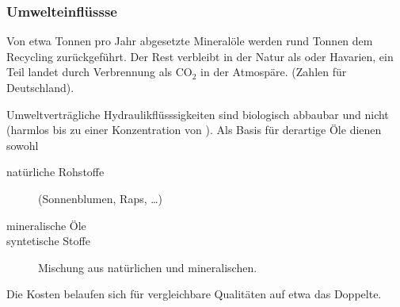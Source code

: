 \begin{frame}
  \frametitle{Umwelteinfl\"ussse}
  Von etwa  Tonnen pro Jahr abgesetzte Mineral\"ole werden
  rund  Tonnen dem Recycling zur\"uckgef\"uhrt. Der Rest 
  verbleibt in der Natur als  oder Havarien, ein 
  Teil landet durch Verbrennung als CO$_2$ in der Atmosp\"are.
  (Zahlen f\"ur Deutschland).

  Umweltvertr\"agliche Hydraulikfl\"usssigkeiten sind biologisch 
   abbaubar und nicht 
  (harmlos bis zu einer Konzentration von ).
  Als Basis f\"ur derartige \"Ole dienen sowohl 
  \begin{description}
    \item[nat\"urliche Rohstoffe] (Sonnenblumen, Raps, \dots )
    \item[mineralische \"Ole] 
    \item[syntetische Stoffe] Mischung aus nat\"urlichen und mineralischen.
  \end{description}
  Die Kosten belaufen sich f\"ur vergleichbare Qualit\"aten auf etwa das 
  Doppelte.
    


  \ifteacher%
  \else%
    \vspace*{-0.10\baselineskip}\rotatebox[origin=lB]{180}{%
    \resizebox{0.9\linewidth}{!}{\parbox[t]{3.95\linewidth}{%
  1.3 Millionen, 0.75 Millionen, Verlustschmierung, schnell, toxisch
    }}}
  \fi%


\end{frame}

